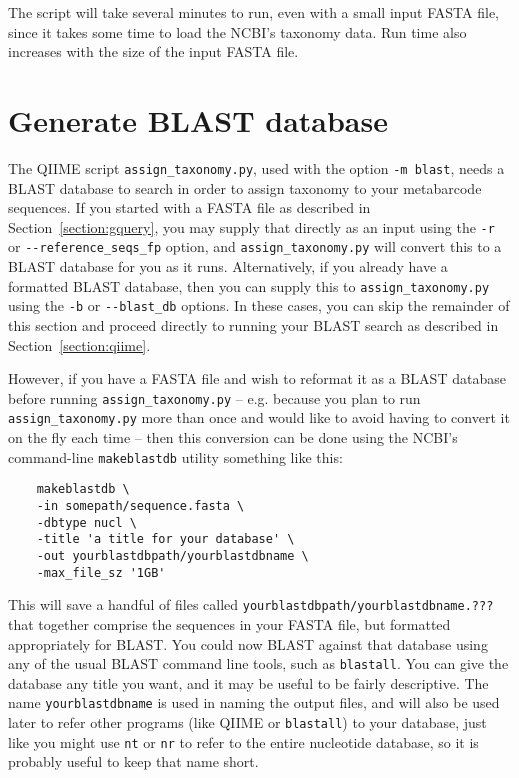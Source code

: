 \documentclass[11pt]{amsart}
\begin{document}
The script will take several minutes to run, even with a small input FASTA file, since it takes some time to load the NCBI's taxonomy data. Run time also increases with the size of the input FASTA file.

\section{Generate BLAST database}
\label{section:blast}

The QIIME script \verb|assign_taxonomy.py|, used with the option \verb|-m blast|, needs a BLAST database to search in order to assign taxonomy to your metabarcode sequences. If you started with a FASTA file as described in Section~\ref{section:gquery}, you may supply that directly as an input using the \verb|-r| or \verb|--reference_seqs_fp| option, and \verb|assign_taxonomy.py| will convert this to a BLAST database for you as it runs. Alternatively, if you already have a formatted BLAST database, then you can supply this to \verb|assign_taxonomy.py| using the \verb|-b| or \verb|--blast_db| options. In these cases, you can skip the remainder of this section and proceed directly to running your BLAST search as described in Section~\ref{section:qiime}.

However, if you have a FASTA file and wish to reformat it as a BLAST database before running \verb|assign_taxonomy.py| -- e.g. because you plan to run \verb|assign_taxonomy.py| more than once and would like to avoid having to convert it on the fly each time -- then this conversion can be done using the NCBI's command-line \verb|makeblastdb| utility something like this:

\begin{verbatim}
    makeblastdb \
    -in somepath/sequence.fasta \
    -dbtype nucl \
    -title 'a title for your database' \
    -out yourblastdbpath/yourblastdbname \
    -max_file_sz '1GB'
\end{verbatim}

This will save a handful of files called \verb|yourblastdbpath/yourblastdbname.???| that together comprise the sequences in your FASTA file, but formatted appropriately for BLAST. You could now BLAST against that database using any of the usual BLAST command line tools, such as \verb|blastall|. You can give the database any title you want, and it may be useful to be fairly descriptive. The name \verb|yourblastdbname| is used in naming the output files, and will also be used later to refer other programs (like QIIME or \verb|blastall|) to your database, just like you might use \verb|nt| or \verb|nr| to refer to the entire nucleotide database, so it is probably useful to keep that name short.
\end{document}
